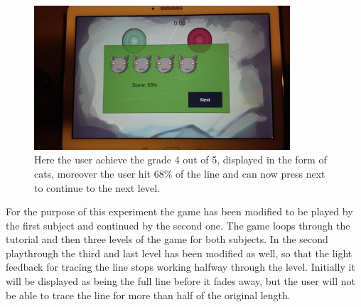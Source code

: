 \begin{figure}[!h]
\includegraphics[width=0.85\textwidth]{img/points}
\caption{Here the user achieve the grade 4 out of 5, displayed in the form of cats, moreover the user hit 68\% of the line and can now press next to continue to the next level.}
\end{figure}
For the purpose of this experiment the game has been modified to be played by the first subject and continued by the second one. The game loops through the tutorial and then three levels of the game for both subjects. In the second playthrough the third and last level has been modified as well, so that the light feedback for tracing the line stops working halfway through the level. Initially it will be displayed as being the full line before it fades away, but the user will not be able to trace the line for more than half of the original length. 